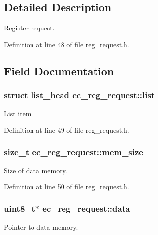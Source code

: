 \subsection{\-Detailed \-Description}
\-Register request. 

\-Definition at line 48 of file reg\-\_\-request.\-h.



\subsection{\-Field \-Documentation}
\subsubsection[{list}]{\setlength{\rightskip}{0pt plus 5cm}struct list\-\_\-head {\bf ec\-\_\-reg\-\_\-request\-::list}}\label{structec__reg__request_a5b7e2c24fe669f62e8d325a3537a1aec}


\-List item. 



\-Definition at line 49 of file reg\-\_\-request.\-h.

\subsubsection[{mem\-\_\-size}]{\setlength{\rightskip}{0pt plus 5cm}size\-\_\-t {\bf ec\-\_\-reg\-\_\-request\-::mem\-\_\-size}}\label{structec__reg__request_a47f808dbe3e2c0eb1931cf5215d5743f}


\-Size of data memory. 



\-Definition at line 50 of file reg\-\_\-request.\-h.

\subsubsection[{data}]{\setlength{\rightskip}{0pt plus 5cm}uint8\-\_\-t$\ast$ {\bf ec\-\_\-reg\-\_\-request\-::data}}\label{structec__reg__request_a55590fb9ebef4fad289a981e5e798f29}


\-Pointer to data memory. 




